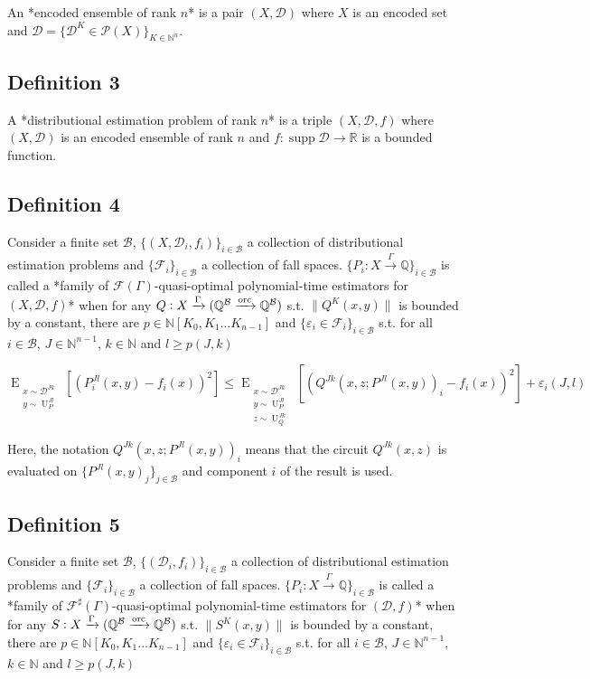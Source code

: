 \documentclass[a4paper]{article}
\DeclareMathOperator{\Supp}{supp}
\newcommand{\EE}[2]{\operatorname{E}_{\substack{#1 \\ #2}}}
\newcommand{\EEE}[3]{\operatorname{E}_{\substack{#1 \\ #2 \\ #3}}}
\DeclareMathOperator{\Un}{U}
\newcommand{\Nats}{\mathbb{N}}
\newcommand{\Rats}{\mathbb{Q}}
\newcommand{\Reals}{\mathbb{R}}
\newcommand{\NatPoly}{\Nats[K_0, K_1 \ldots K_{n-1}]}
\newcommand{\Norm}[1]{\lVert #1 \rVert}
\newcommand{\Dist}{\mathcal{D}}
\newcommand{\Fall}{\mathcal{F}}
\newcommand{\EG}{\Fall(\Gamma)}
\newcommand{\ESG}{\Fall^\sharp(\Gamma)}
\newcommand{\Scheme}{\xrightarrow{\Gamma}}
\newcommand{\ORC}{\xrightarrow{\textnormal{orc}}}
\newcommand{\Base}{\mathcal{B}}
\newcommand{\Prob}{\mathcal{P}}
\begin{document}
An *encoded ensemble of rank ${n}$* is a pair ${(X,\Dist)}$ where ${X}$ is an encoded set and ${\Dist=\{\Dist^K \in \Prob(X)\}_{K \in \Nats^n}}$.

\subsection{Definition 3}

A *distributional estimation problem of rank ${n}$* is a triple ${(X,\Dist,f)}$ where ${(X,\Dist)}$ is an encoded ensemble of rank ${n}$ and ${f: \Supp \Dist \rightarrow \Reals}$ is a bounded function.

\subsection{Definition 4}

Consider a finite set ${\Base}$, ${\{(X,\Dist_i,f_i)\}_{i \in \Base}}$ a collection of distributional estimation problems and ${\{\Fall_i\}_{i \in \Base}}$ a collection of fall spaces. ${\{P_i: X \Scheme \Rats\}_{i \in \Base}}$ is called a *family of ${\EG}$-quasi-optimal polynomial-time estimators for ${(X,\Dist,f)}$* when for any ${Q: X \Scheme (\Rats^{\Base} \ORC \Rats^{\Base})}$ s.t. ${\Norm{Q^K(x,y)}}$ is bounded by a constant, there are ${p \in \NatPoly}$ and ${\{\varepsilon_i \in \Fall_i\}_{i \in \Base}}$ s.t. for all ${i \in \Base}$, ${J \in \Nats^{n-1}}$, ${k \in \Nats}$ and ${l \geq p(J,k)}$

$$\EE{x \sim \Dist^{Jk}}{y \sim \Un_P^{Jl}}[(P_i^{Jl}(x,y)-f_i(x))^2] \leq \EEE{x \sim \Dist^{Jk}}{y \sim \Un_P^{Jl}}{z \sim \Un_Q^{Jk}}[(Q^{Jk}(x,z;P^{Jl}(x,y))_i-f_i(x))^2]+\varepsilon_i(J,l)$$

Here, the notation ${Q^{Jk}(x,z;P^{Jl}(x,y))_i}$ means that the circuit ${Q^{Jk}(x,z)}$ is evaluated on ${\{P^{Jl}(x,y)_j\}_{j \in \Base}}$ and component ${i}$ of the result is used.

\subsection{Definition 5}

Consider a finite set ${\Base}$, ${\{(\Dist_i,f_i)\}_{i \in \Base}}$ a collection of distributional estimation problems and ${\{\Fall_i\}_{i \in \Base}}$ a collection of fall spaces. ${\{P_i: X \Scheme \Rats\}_{i \in \Base}}$ is called a *family of ${\ESG}$-quasi-optimal polynomial-time estimators for ${(\Dist,f)}$* when for any ${S: X \Scheme (\Rats^{\Base} \ORC \Rats^{\Base})}$ s.t. ${\Norm{S^K(x,y)}}$ is bounded by a constant, there are ${p \in \NatPoly}$ and ${\{\varepsilon_i \in \Fall_i\}_{i \in \Base}}$ s.t. for all ${i \in \Base}$, ${J \in \Nats^{n-1}}$, ${k \in \Nats}$ and ${l \geq p(J,k)}$
\end{document}
